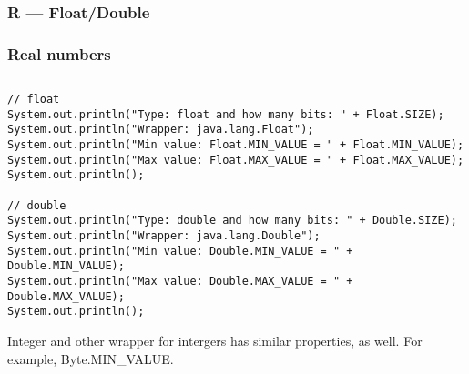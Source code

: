 \documentclass[en, 11pt, xcolor=dvipsnames]{beamer}
\begin{document}
\subsubsection{R --- Float/Double}
\begin{frame}[fragile]
	\frametitle{Real numbers}


	\begin{columns}[c]
		\begin{column}{0.9\textwidth}

			\begin{lstlisting}[style=Java]
// float
System.out.println("Type: float and how many bits: " + Float.SIZE);
System.out.println("Wrapper: java.lang.Float");
System.out.println("Min value: Float.MIN_VALUE = " + Float.MIN_VALUE);
System.out.println("Max value: Float.MAX_VALUE = " + Float.MAX_VALUE);
System.out.println();

// double
System.out.println("Type: double and how many bits: " + Double.SIZE);
System.out.println("Wrapper: java.lang.Double");
System.out.println("Min value: Double.MIN_VALUE = " + Double.MIN_VALUE);
System.out.println("Max value: Double.MAX_VALUE = " + Double.MAX_VALUE);
System.out.println(); \end{lstlisting}

			\tiny {
				Integer and other wrapper for intergers has similar properties, as well.
				For example, Byte.MIN\_VALUE.
			}

		\end{column}
	\end{columns}

\end{frame}
\end{document}
